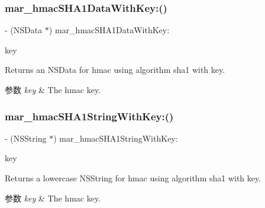 \subsubsection{\texorpdfstring{mar\+\_\+hmac\+S\+H\+A1\+Data\+With\+Key\+:()}{mar\_hmacSHA1DataWithKey:()}}
{\footnotesize\ttfamily -\/ (N\+S\+Data $\ast$) mar\+\_\+hmac\+S\+H\+A1\+Data\+With\+Key\+: \begin{DoxyParamCaption}\item[{(N\+S\+Data $\ast$)}]{key }\end{DoxyParamCaption}}

Returns an N\+S\+Data for hmac using algorithm sha1 with key. 
\begin{DoxyParams}{参数}
{\em key} & The hmac key. \\
\hline
\end{DoxyParams}
\mbox{\label{category_n_s_data_07_m_a_r_e_x_08_af09d166373bf8f361f340626ab70777d}} 
\subsubsection{\texorpdfstring{mar\+\_\+hmac\+S\+H\+A1\+String\+With\+Key\+:()}{mar\_hmacSHA1StringWithKey:()}}
{\footnotesize\ttfamily -\/ (N\+S\+String $\ast$) mar\+\_\+hmac\+S\+H\+A1\+String\+With\+Key\+: \begin{DoxyParamCaption}\item[{(N\+S\+String $\ast$)}]{key }\end{DoxyParamCaption}}

Returns a lowercase N\+S\+String for hmac using algorithm sha1 with key. 
\begin{DoxyParams}{参数}
{\em key} & The hmac key. \\
\hline
\end{DoxyParams}
\mbox{\label{category_n_s_data_07_m_a_r_e_x_08_aa868eeb4dc331761fc7d64af1486c793}} 
